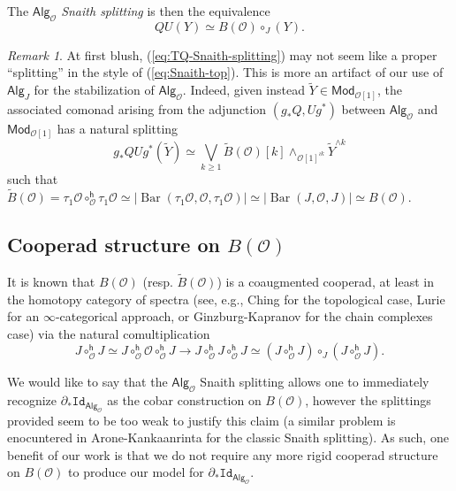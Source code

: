 \documentclass[11pt]{amsart}
\theoremstyle{definition}
\theoremstyle{remark}
\newtheorem{remark}[subsection]{Remark}
\newcommand{\Alg}[1]{ {\mathsf{Alg}_{\mathcal{#1}}} }
\newcommand{\Id}{\mathtt{Id}}
\newcommand{\Barr}{\operatorname{Bar}}
\newcommand{\Cal}[1]{\mathcal{#1}}
\begin{document}
The \textit{$\Alg{O}$ Snaith splitting} is then the equivalence \begin{equation}\label{eq:TQ-Snaith-splitting}
    Q U(Y)\simeq B(\Cal{O}) \circ_J (Y).
\end{equation}

\begin{remark} 
    At first blush, (\ref{eq:TQ-Snaith-splitting}) may not seem like a proper ``splitting'' in the style of (\ref{eq:Snaith-top}). This is more an artifact of our use of $\mathsf{Alg}_J$ for the stabilization of $\Alg{O}$. Indeed, given instead $\widetilde{Y}\in \mathsf{Mod}_{\Cal{O}[1]}$, the associated comonad arising from the adjunction $(g_*Q, Ug^*)$ between $\Alg{O}$ and $\mathsf{Mod}_{\Cal{O}[1]}$ has a natural splitting \[
    g_* Q Ug^* (\widetilde{Y})\simeq \bigvee_{k\geq 1} \widetilde{B}(\Cal{O})[k] \wedge_{\Cal{O}[1]^{\wr k}} \widetilde{Y}^{\wedge k}\]
    such that $\widetilde{B}(\Cal{O})= \tau_1\Cal{O} \circ^{\mathsf{h}}_{\Cal{O}} \tau_1 \Cal{O} \simeq |\Barr(\tau_1\Cal{O}, \Cal{O}, \tau_1\Cal{O})| \simeq |\Barr(J,\Cal{O},J)|\simeq B(\Cal{O})$. 
\end{remark}
    
\subsection{Cooperad structure on $B(\Cal{O})$} \label{B(O)} It is known that $B(\Cal{O})$ (resp. $\widetilde{B}(\Cal{O})$) is a coaugmented cooperad, at least in the homotopy category of spectra (see, e.g.,  Ching \cite{Ching-thesis} for the topological case, Lurie \cite[]{Lur} for an $\infty$-categorical approach, or Ginzburg-Kapranov \cite{Ginz-Kap} for the chain complexes case) via the natural comultiplication  \[ J \circ^{\mathsf{h}}_{\Cal{O}} J \simeq J \circ^{\mathsf{h}}_{\Cal{O}} \Cal{O} \circ^{\mathsf{h}}_{\Cal{O}} J \to J \circ^{\mathsf{h}}_{\Cal{O}} J \circ^{\mathsf{h}}_{\Cal{O}} J \simeq (J \circ^{\mathsf{h}}_{\Cal{O}} J) \circ_J (J \circ^{\mathsf{h}}_{\Cal{O}} J) .\]
    
    We would like to say that the $\Alg{O}$ Snaith splitting allows one to immediately recognize $\partial_* \Id_{\Alg{O}}$ as the cobar construction on $B(\Cal{O})$, however the splittings provided seem to be too weak to justify this claim (a similar problem is enocuntered in Arone-Kankaanrinta \cite{AK} for the classic Snaith splitting). As such, one benefit of our work is that we do not require any more rigid cooperad structure on $B(\Cal{O})$ to produce our model for $\partial_* \Id_{\Alg{O}}$. 
    
\end{document}
